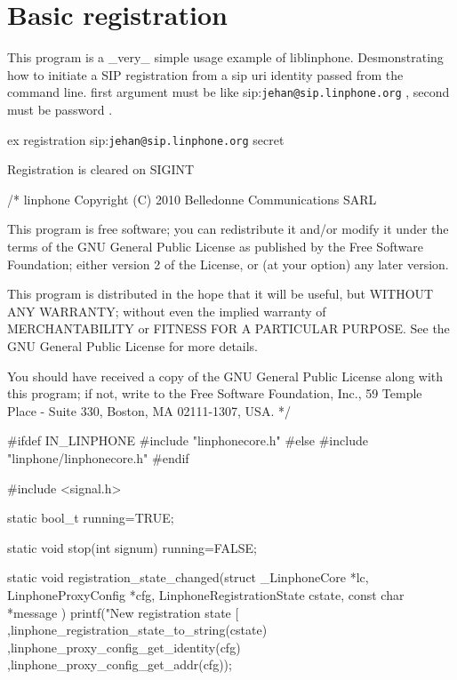 \section{\-Basic registration}
\label{group__registration__tutorials}
\-This program is a \-\_\-very\-\_\- simple usage example of liblinphone. \-Desmonstrating how to initiate a \-S\-I\-P registration from a sip uri identity passed from the command line. first argument must be like sip\-:{\tt jehan@sip.\-linphone.\-org} , second must be password . \par
 ex registration sip\-:{\tt jehan@sip.\-linphone.\-org} secret \par
\-Registration is cleared on \-S\-I\-G\-I\-N\-T \par
 
\begin{DoxyCodeInclude}

/*
linphone
Copyright (C) 2010  Belledonne Communications SARL 

This program is free software; you can redistribute it and/or
modify it under the terms of the GNU General Public License
as published by the Free Software Foundation; either version 2
of the License, or (at your option) any later version.

This program is distributed in the hope that it will be useful,
but WITHOUT ANY WARRANTY; without even the implied warranty of
MERCHANTABILITY or FITNESS FOR A PARTICULAR PURPOSE.  See the
GNU General Public License for more details.

You should have received a copy of the GNU General Public License
along with this program; if not, write to the Free Software
Foundation, Inc., 59 Temple Place - Suite 330, Boston, MA  02111-1307, USA.
*/

#ifdef IN_LINPHONE
#include "linphonecore.h"
#else
#include "linphone/linphonecore.h"
#endif

#include <signal.h>

static bool_t running=TRUE;

static void stop(int signum){
        running=FALSE;
}

static void registration_state_changed(struct _LinphoneCore *lc, 
      LinphoneProxyConfig *cfg, LinphoneRegistrationState cstate, const char *message
      ){
                printf("New registration state %
       [%
                                ,linphone_registration_state_to_string(cstate)
                                ,linphone_proxy_config_get_identity(cfg)
                                ,linphone_proxy_config_get_addr(cfg));
}


\end{DoxyCodeInclude}
